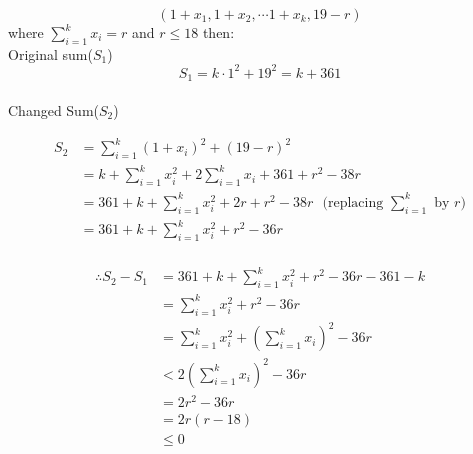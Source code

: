 \documentclass[a4paper,10pt]{article}
\begin{document}
    $$ (1+x_{1},1+x_{2}, \cdots 1+x_{k},19-r)$$ where $\sum_{i=1}^{k} x_{i} = r $ and $r \le 18$ then: \\
    
    Original sum($S_{1}$) $$S_{1} = k\cdot 1^2 + 19^2 = k+361$$ \\
    
    Changed  Sum($S_{2}$) %
   

\begin{equation}
\begin{split}
 S_{2} & =\sum_{i=1}^{k} (1+x_{i})^2 + (19-r)^2 \\
       & = k+ \sum_{i=1}^{k} x_{i}^2 + 2 \sum_{i=1}^{k} x_{i} + 361 + r^2 -38r \\
       & = 361+k + \sum_{i=1}^{k} x_{i}^2 + 2r + r^2 -38r  \hspace{8pt}\text{(replacing $\sum_{i=1}^{k}$ by $r$)}  \\
       & = 361+k + \sum_{i=1}^{k} x_{i}^2 + r^2 -36r \\
\end{split}
\end{equation}


   
\begin{equation}
\begin{split}
  \therefore  S_{2}-S_{1} & = 361+k+ \sum_{i=1}^{k} x_{i}^2 +r^2 -36r -361-k \\
                          & = \sum_{i=1}^{k} x_{i}^2 +r^2 -36r \\
                          & = \sum_{i=1}^{k} x_{i}^2 +(\sum_{i=1}^{k} x_{i})^2 - 36r \\
                          & < 2(\sum_{i=1}^{k} x_{i})^2 -36r \\
                          & =2r^2-36r \\
                          & =2r(r-18) \\      
                          &  \le 0
\end{split}
\end{equation}




    \begin{center}
      \\
    \end{center}

    
    
    
\end{document}
